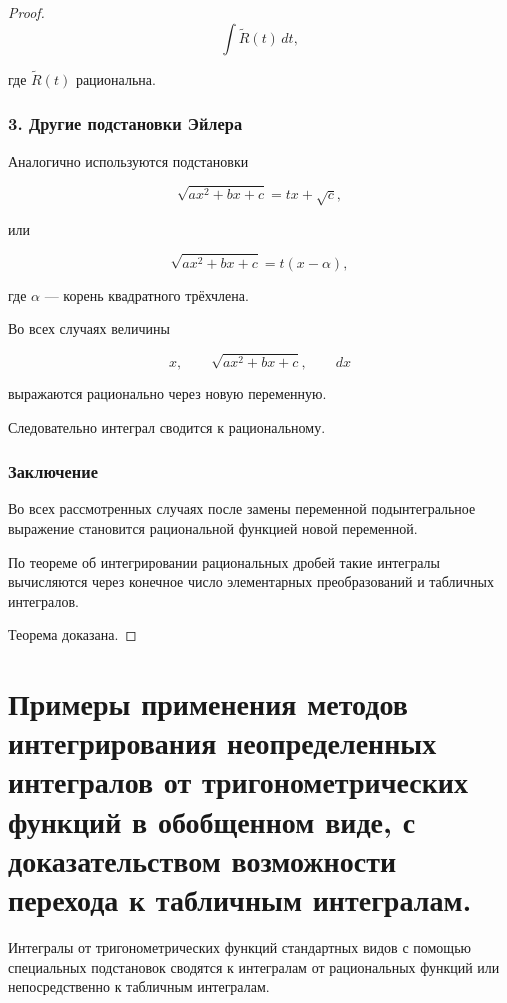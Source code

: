 \documentclass[14pt]{extreport}
\begin{document}
\begin{proof}
\[
\int \widetilde R(t)\,dt,
\]

где $\widetilde R(t)$ рациональна.

\subsection*{3. Другие подстановки Эйлера}

Аналогично используются подстановки

\[
\sqrt{ax^2+bx+c}=tx+\sqrt c,
\]

или

\[
\sqrt{ax^2+bx+c}=t(x-\alpha),
\]

где $\alpha$ --- корень квадратного трёхчлена.

Во всех случаях величины

\[
x,\qquad
\sqrt{ax^2+bx+c},\qquad
dx
\]

выражаются рационально через новую переменную.

Следовательно интеграл сводится к рациональному.

\subsection*{Заключение}

Во всех рассмотренных случаях после замены переменной подынтегральное выражение становится рациональной функцией новой переменной.

По теореме об интегрировании рациональных дробей такие интегралы вычисляются через конечное число элементарных преобразований и табличных интегралов.

Теорема доказана.
\end{proof}

\chapter{Примеры применения методов интегрирования неопределенных интегралов от тригонометрических функций в обобщенном виде, с доказательством возможности перехода к табличным интегралам.}
\begin{theorem}
Интегралы от тригонометрических функций стандартных видов
с помощью специальных подстановок сводятся к интегралам от рациональных функций или непосредственно к табличным интегралам.
\end{theorem}
\end{document}
